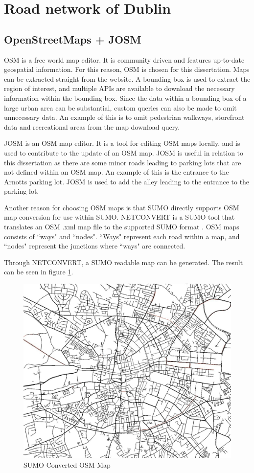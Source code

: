 \section{Road network of Dublin}

\subsection{OpenStreetMaps + JOSM}\label{ssec:netconvert}
\ac{OSM} is a free world map editor. It is community driven and features up-to-date geospatial information. For this reason, \ac{OSM} is chosen for this dissertation. Maps can be extracted straight from the website. A bounding box is used to extract the region of interest, and multiple APIs are available to download the necessary information within the bounding box. Since the data within a bounding box of a large urban area can be substantial, custom queries can also be made to omit unnecessary data. An example of this is to omit pedestrian walkways, storefront data and recreational areas from the map download query. 

\ac{JOSM} is an \ac{OSM} map editor. It is a tool for editing \ac{OSM} maps locally, and is used to contribute to the update of an \ac{OSM} map. \ac{JOSM} is useful in relation to this dissertation as there are some minor roads leading to parking lots that are not defined within an \ac{OSM} map. An example of this is the entrance to the Arnotts parking lot. \ac{JOSM} is used to add the alley leading to the entrance to the parking lot.

Another reason for choosing \ac{OSM} maps is that \ac{SUMO} directly supports \ac{OSM} map conversion for use within SUMO. NETCONVERT is a SUMO tool that translates an \ac{OSM} .xml map file to the supported \ac{SUMO} format \citep{SUMO2008NETCONVERT}. \ac{OSM} maps consists of ``ways" and ``nodes". ``Ways" represent each road within a map, and ``nodes" represent the junctions where ``ways" are connected.

Through NETCONVERT, a \ac{SUMO} readable map can be generated. The result can be seen in figure \ref{fig:SUMODUBLIN}.

\begin{figure}[h]
    \centering
    \includegraphics[width=\textwidth]{./Images/SUMODUBLIN.jpg}
    \caption{\ac{SUMO} Converted \ac{OSM} Map}
    \label{fig:SUMODUBLIN}
\end{figure}